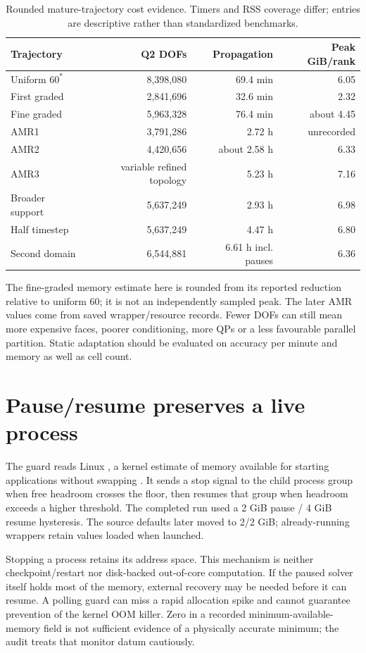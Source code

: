 \begin{table}[htbp]\centering\caption{Rounded mature-trajectory cost evidence. Timers and RSS coverage differ; entries are descriptive rather than standardized benchmarks.}\label{tab:cost}
\begin{tabular}{lrrr}\toprule Trajectory & Q2 DOFs & Propagation & Peak GiB/rank\\\midrule
Uniform $60^*$ & 8,398,080 & 69.4 min & 6.05\\
First graded & 2,841,696 & 32.6 min & 2.32\\
Fine graded & 5,963,328 & 76.4 min & about 4.45\\
AMR1 & 3,791,286 & 2.72 h & unrecorded\\
AMR2 & 4,420,656 & about 2.58 h & 6.33\\
AMR3 & variable refined topology & 5.23 h & 7.16\\
Broader support & 5,637,249 & 2.93 h & 6.98\\
Half timestep & 5,637,249 & 4.47 h & 6.80\\
Second domain & 6,544,881 & 6.61 h incl. pauses & 6.36\\\bottomrule\end{tabular}\end{table}

The fine-graded memory estimate here is rounded from its reported reduction relative to uniform 60; it is not an independently sampled peak. The later AMR values come from saved wrapper/resource records. Fewer DOFs can still mean more expensive faces, poorer conditioning, more QPs or a less favourable parallel partition. Static adaptation should be evaluated on accuracy per minute and memory as well as cell count.

\section{Pause/resume preserves a live process}
The guard reads Linux , a kernel estimate of memory available for starting applications without swapping \cite{linuxproc}. It sends a stop signal to the child process group when free headroom crosses the floor, then resumes that group when headroom exceeds a higher threshold. The completed run used a 2 GiB pause / 4 GiB resume hysteresis. The source defaults later moved to 2/2 GiB; already-running wrappers retain values loaded when launched.

Stopping a process retains its address space. This mechanism is neither checkpoint/restart nor disk-backed out-of-core computation. If the paused solver itself holds most of the memory, external recovery may be needed before it can resume. A polling guard can miss a rapid allocation spike and cannot guarantee prevention of the kernel OOM killer. Zero in a recorded minimum-available-memory field is not sufficient evidence of a physically accurate minimum; the audit treats that monitor datum cautiously.

